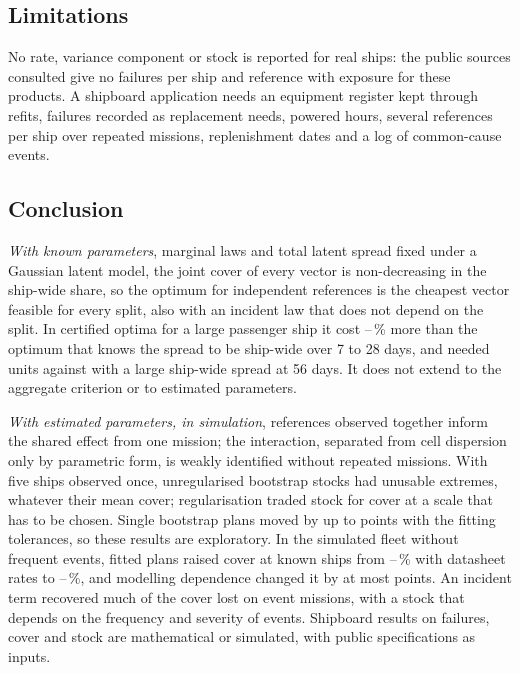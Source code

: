 \subsection{Limitations}
No rate, variance component or stock is reported for real ships: the public
sources consulted give no failures per ship and reference with exposure for
these products. A
shipboard application needs an equipment register kept through refits,
failures recorded as replacement needs, powered hours, several references per
ship over repeated missions, replenishment dates and a log of common-cause
events.

\subsection{Conclusion}
\emph{With known parameters}, marginal laws and total latent spread fixed under
a Gaussian latent model, the joint cover of every vector is non-decreasing in
the ship-wide share, so the optimum for independent references is the
cheapest vector feasible for every split, also with an incident law that does
not depend on the split. In certified optima for a large passenger ship it
cost \shPremFourteen--\shPremMax\,\% more than the optimum that knows the
spread to be ship-wide over 7 to 28 days, and needed \brBigInd{} units against
\brBigDep{} with a large ship-wide spread at 56 days. It does not extend to
the aggregate criterion or to estimated parameters.

\emph{With estimated parameters, in simulation}, references observed together
inform the shared effect from one mission; the interaction, separated from
cell dispersion only by parametric form, is weakly identified without repeated
missions.
With five ships observed once, unregularised bootstrap stocks had unusable
extremes, whatever their mean cover; regularisation traded stock for cover at a scale that has to
be chosen. Single bootstrap plans moved by up to \rcPolCov{} points with the
fitting tolerances, so these results are exploratory. In the simulated
fleet without frequent events, fitted plans raised cover at known ships from
\fdMtbfLo--\fdMtbfHi\,\% with datasheet rates to \fdFitKLo--\fdFitKHi\,\%,
and modelling dependence changed it by at most \fdAbsDcMax{} points. An incident term
recovered much of the cover lost on event missions, with a stock that depends
on the frequency and severity of events. Shipboard results on failures, cover
and stock are mathematical or simulated, with public specifications as inputs.
